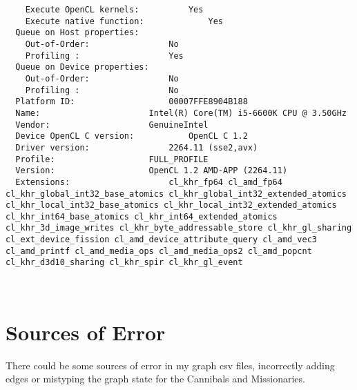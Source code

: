 \documentclass[12pt]{article}
\begin{document}
\begin{lstlisting}
    Execute OpenCL kernels:			 Yes
    Execute native function:			 Yes
  Queue on Host properties:				 
    Out-of-Order:				 No
    Profiling :					 Yes
  Queue on Device properties:				 
    Out-of-Order:				 No
    Profiling :					 No
  Platform ID:					 00007FFE8904B188
  Name:						 Intel(R) Core(TM) i5-6600K CPU @ 3.50GHz
  Vendor:					 GenuineIntel
  Device OpenCL C version:			 OpenCL C 1.2 
  Driver version:				 2264.11 (sse2,avx)
  Profile:					 FULL_PROFILE
  Version:					 OpenCL 1.2 AMD-APP (2264.11)
  Extensions:					 cl_khr_fp64 cl_amd_fp64 cl_khr_global_int32_base_atomics cl_khr_global_int32_extended_atomics cl_khr_local_int32_base_atomics cl_khr_local_int32_extended_atomics cl_khr_int64_base_atomics cl_khr_int64_extended_atomics cl_khr_3d_image_writes cl_khr_byte_addressable_store cl_khr_gl_sharing cl_ext_device_fission cl_amd_device_attribute_query cl_amd_vec3 cl_amd_printf cl_amd_media_ops cl_amd_media_ops2 cl_amd_popcnt cl_khr_d3d10_sharing cl_khr_spir cl_khr_gl_event 



\end{lstlisting}

\section{ Sources of Error}
There could be some sources of error in my graph csv files, 
incorrectly adding edges or mistyping the graph state for the Cannibals and Missionaries.


\end{document}
